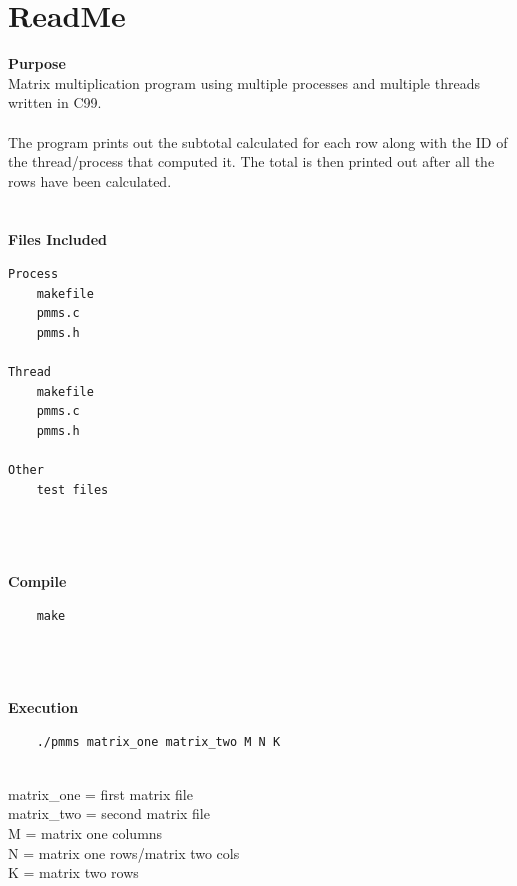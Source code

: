 \documentclass{article}
\begin{document}
\section{ReadMe}
\textbf{Purpose}\\
Matrix multiplication program using multiple processes and multiple threads
written in C99.
\\\\
The program prints out the subtotal calculated for each row along with the ID
of the thread/process that computed it. The total is then printed out after
all the rows have been calculated.
\\\\\\
\textbf{Files Included}
\begin{verbatim}
Process
    makefile
    pmms.c
    pmms.h

Thread
    makefile
    pmms.c
    pmms.h

Other
    test files
\end{verbatim}
\\\\\\
\textbf{Compile}
\begin{verbatim}
    make
\end{verbatim}
\\\\\\
\textbf{Execution}
\begin{verbatim}
    ./pmms matrix_one matrix_two M N K
\end{verbatim}
\\
matrix\_one = first matrix file\\
matrix\_two = second matrix file\\
M = matrix one columns\\
N = matrix one rows/matrix two cols\\
K = matrix two rows\\




\end{document}
